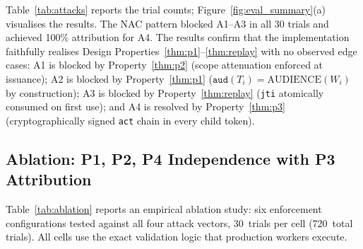 \documentclass[journal]{IEEEtran}
\theoremstyle{definition}
\begin{document}
Table~\ref{tab:attacks} reports the trial counts; Figure~\ref{fig:eval_summary}(a) visualises the results.
The NAC pattern blocked A1--A3 in all 30 trials and achieved 100\%
attribution for A4. The results confirm that the implementation faithfully
realises
Design Properties~\ref{thm:p1}--\ref{thm:replay} with no observed edge cases:
A1 is blocked by Property~\ref{thm:p2} (scope attenuation enforced at issuance);
A2 is blocked by Property~\ref{thm:p1} ($\texttt{aud}(T_i)=\mathrm{AUDIENCE}(W_i)$
by construction); A3 is blocked by Property~\ref{thm:replay} (\texttt{jti}
atomically consumed on first use); and A4 is resolved by Property~\ref{thm:p3}
(cryptographically signed \texttt{act} chain in every child token).

\subsection{Ablation: P1, P2, P4 Independence with P3 Attribution}
\label{sec:ablation}

Table~\ref{tab:ablation} reports an empirical ablation study: six enforcement
configurations tested against all four attack vectors, 30~trials per cell
(720~total trials). All cells use the exact validation logic that production
workers execute.

\begin{table}[h]
\caption{Ablation study: property independence ($N=30$; 720 total trials)}
\label{tab:ablation}
\centering
\footnotesize
\setlength{\tabcolsep}{3pt}
\end{table}
\end{document}
